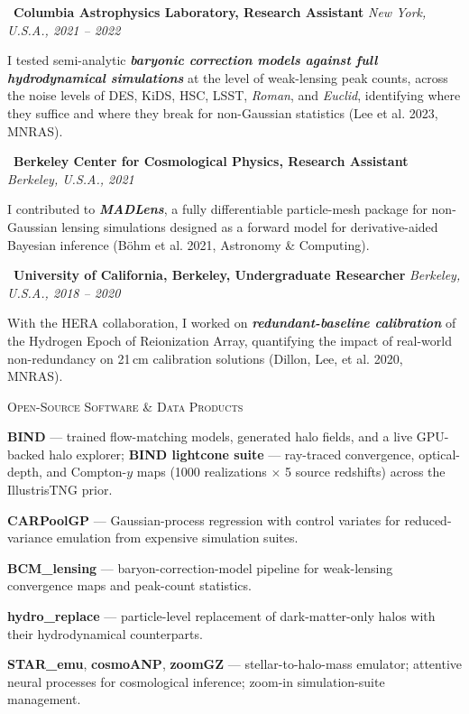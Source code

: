 \documentclass[11pt,letterpaper]{article}
\newcommand{\cvsection}[1]{%
  \vspace{1.05em}%
  {\color{head}\large\scshape #1}\par
  \vspace{-0.5em}{\color{rulec}\rule{\linewidth}{1.1pt}}\par
  \vspace{0.15em}%
}
\newenvironment{tightlist}{%
  \begin{list}{\textbullet}{%
    \setlength{\leftmargin}{1.3em}%
    \setlength{\itemsep}{0.3em}%
    \setlength{\parsep}{0pt}%
    \setlength{\topsep}{0.2em}}%
}{\end{list}}
\begin{document}
\textbullet~\textbf{Columbia Astrophysics Laboratory, Research Assistant}
\hfill {\itshape New York, U.S.A., 2021 -- 2022}\par
I tested semi-analytic \textbf{\textit{baryonic correction models against full hydrodynamical
simulations}} at the level of weak-lensing peak counts, across the noise levels of DES, KiDS, HSC,
LSST, \textit{Roman}, and \textit{Euclid}, identifying where they suffice and where they break for
non-Gaussian statistics {\color{faint}(Lee et al. 2023, MNRAS)}.

\textbullet~\textbf{Berkeley Center for Cosmological Physics, Research Assistant}
\hfill {\itshape Berkeley, U.S.A., 2021}\par
I contributed to \textbf{\textit{MADLens}}, a fully differentiable particle-mesh package for
non-Gaussian lensing simulations designed as a forward model for derivative-aided Bayesian inference
{\color{faint}(B\"ohm et al. 2021, Astronomy \& Computing)}.

\textbullet~\textbf{University of California, Berkeley, Undergraduate Researcher}
\hfill {\itshape Berkeley, U.S.A., 2018 -- 2020}\par
With the HERA collaboration, I worked on \textbf{\textit{redundant-baseline calibration}} of the
Hydrogen Epoch of Reionization Array, quantifying the impact of real-world non-redundancy on 21\,cm
calibration solutions {\color{faint}(Dillon, Lee, et al. 2020, MNRAS)}.

\cvsection{Open-Source Software \& Data Products}
\begin{tightlist}
  \item \textbf{BIND} --- trained flow-matching models, generated halo fields, and a live GPU-backed
    halo explorer; \textbf{BIND lightcone suite} --- ray-traced convergence, optical-depth, and
    Compton-$y$ maps (1000 realizations $\times$ 5 source redshifts) across the IllustrisTNG prior.
  \item \textbf{CARPoolGP} --- Gaussian-process regression with control variates for reduced-variance
    emulation from expensive simulation suites.
  \item \textbf{BCM\_lensing} --- baryon-correction-model pipeline for weak-lensing convergence maps
    and peak-count statistics.
  \item \textbf{hydro\_replace} --- particle-level replacement of dark-matter-only halos with their
    hydrodynamical counterparts.
  \item \textbf{STAR\_emu}, \textbf{cosmoANP}, \textbf{zoomGZ} --- stellar-to-halo-mass emulator;
    attentive neural processes for cosmological inference; zoom-in simulation-suite management.
\end{tightlist}
\end{document}
